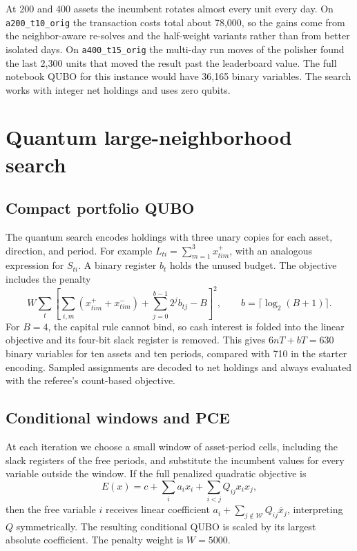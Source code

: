 \documentclass[a4paper]{article}
\begin{document}
At 200 and 400 assets the incumbent rotates almost every unit every day. On \texttt{a200\_t10\_orig} the transaction
costs total about 78,000, so the gains come from the neighbor-aware re-solves and the half-weight variants rather than
from better isolated days. On \texttt{a400\_t15\_orig} the multi-day run moves of the polisher found the last 2,300 units
that moved the result past the leaderboard value. The full notebook QUBO for this instance would have 36,165 binary
variables. The search works with integer net holdings and uses zero qubits.

\clearpage
\section{Quantum large-neighborhood search}

\subsection{Compact portfolio QUBO}

The quantum search encodes holdings with three unary copies for each asset, direction, and period.
For example \(L_{ti}=\sum_{m=1}^{3}x^+_{tim}\), with an analogous expression for \(S_{ti}\).
A binary register \(b_t\) holds the unused budget. The objective includes the penalty
\[
W\sum_t\left[\sum_{i,m}(x^+_{tim}+x^-_{tim})
              +\sum_{j=0}^{b-1}2^j b_{tj}-B\right]^2,
\qquad b=\lceil\log_2(B+1)\rceil .
\]
For \(B=4\), the capital rule cannot bind, so cash interest is folded into the linear objective
and its four-bit slack register is removed. This gives \(6nT+bT=630\) binary variables for ten assets and ten periods,
compared with 710 in the starter encoding. Sampled assignments are decoded to net holdings and always evaluated with
the referee's count-based objective.

\subsection{Conditional windows and PCE}

At each iteration we choose a small window of asset-period cells, including the slack registers of the free periods,
and substitute the incumbent values for every variable outside the window.
If the full penalized quadratic objective is
\[
E(x)=c+\sum_i a_ix_i+\sum_{i<j}Q_{ij}x_ix_j ,
\]
then the free variable \(i\) receives linear coefficient
\(a_i+\sum_{j\notin\mathcal W}Q_{ij}\bar x_j\), interpreting \(Q\) symmetrically.
The resulting conditional QUBO is scaled by its largest absolute coefficient. The penalty weight is \(W=5000\).
\end{document}
